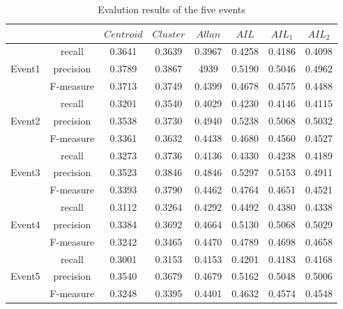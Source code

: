 \documentclass[runningheads,a4paper]{llncs}
\begin{document}
\begin{table}
\centering
\caption{Evalution results of the five events }
\begin{tabular}{c|c c c c c c c}
\hline
                  &             		& $Centroid$ & $Cluster$ & $Allan$    & $AIL$       & $AIL_1$    & $AIL_2$ \\
\hline
                 &  recall		& 0.3641     & 0.3639 & 0.3967 & 0.4258 & 0.4186 & 0.4098 \\
Event1   &  precision	& 0.3789     & 0.3867 & 4939    & 0.5190 & 0.5046 & 0.4962 \\
	       &  F-measure	& 0.3713     & 0.3749 & 0.4399 & 0.4678 & 0.4575 & 0.4488 \\
\hline
                 &  recall 		& 0.3201     & 0.3540 & 0.4029 & 0.4230 & 0.4146 & 0.4115 \\
Event2   &  precision	& 0.3538     & 0.3730 & 0.4940 & 0.5238 & 0.5068 & 0.5032 \\
	       &  F-measure 	& 0.3361     & 0.3632 & 0.4438 & 0.4680 & 0.4560 & 0.4527 \\
\hline
                 &  recall 		& 0.3273     & 0.3736 & 0.4136 & 0.4330 & 0.4238 & 0.4189 \\
Event3   &  precision	& 0.3523     & 0.3846 & 0.4846 & 0.5297 & 0.5153 & 0.4911 \\
	       &  F-measure 	& 0.3393     & 0.3790 & 0.4462 & 0.4764 & 0.4651 & 0.4521 \\
\hline
                 &  recall 		& 0.3112     & 0.3264 & 0.4292 & 0.4492 & 0.4380 & 0.4338 \\
Event4   &  precision	& 0.3384     & 0.3692 & 0.4664 & 0.5130 & 0.5068 & 0.5029 \\
	       &  F-measure 	& 0.3242     & 0.3465 & 0.4470 & 0.4789 & 0.4698 & 0.4658 \\
\hline
                 &  recall 		& 0.3001     & 0.3153 & 0.4153 & 0.4201 & 0.4183 & 0.4168 \\
Event5   &  precision	& 0.3540     & 0.3679 & 0.4679 & 0.5162 & 0.5048 & 0.5006 \\
	       &  F-measure 	& 0.3248     & 0.3395 & 0.4401 & 0.4632 & 0.4574 & 0.4548 \\
\hline
\end{tabular}
\label{evalutions}
\end{table}
\end{document}
